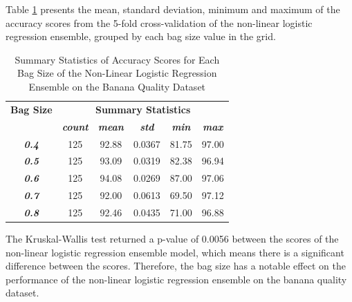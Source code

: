 \documentclass[10pt, conference]{IEEEtran}
\begin{document}
Table \ref{table: BQ_bagsize_nonlinear_performance_metrics} presents the mean, standard deviation, minimum and maximum of the
accuracy scores from the 5-fold cross-validation of the non-linear logistic regression ensemble, grouped by each bag size
value in the grid.
\begin{table}[H]
    \caption{Summary Statistics of Accuracy Scores for Each Bag Size of the Non-Linear Logistic Regression Ensemble on the Banana Quality Dataset}
    \begin{center}
        \begin{tabular}{|c||c|c|c|c|c|}
            \hline
            \textbf{Bag Size}&\multicolumn{5}{|c|}{\textbf{Summary Statistics}} \\
            \cline{2-6}
                                &\textbf{\textit{count}} & \textbf{\textit{mean}} & \textbf{\textit{std}} & \textbf{\textit{min}} & \textbf{\textit{max}}\\
            \hline
            \textbf{\textit{0.4}} & 125 & 92.88 & 0.0367 & 81.75 & 97.00 \\
            \textbf{\textit{0.5}} & 125 & 93.09 & 0.0319 & 82.38 & 96.94 \\
            \textbf{\textit{0.6}} & 125 & 94.08 & 0.0269 & 87.00 & 97.06 \\
            \textbf{\textit{0.7}} & 125 & 92.00 & 0.0613 & 69.50 & 97.12 \\
            \textbf{\textit{0.8}} & 125 & 92.46 & 0.0435 & 71.00 & 96.88 \\
            \hline
        \end{tabular}
    \end{center}
    \label{table: BQ_bagsize_nonlinear_performance_metrics}
\end{table}
The Kruskal-Wallis test returned a p-value of 0.0056 between the scores of the non-linear logistic regression ensemble model,
which means there is a significant difference between the scores. Therefore, the bag size has a notable effect on the
performance of the non-linear logistic regression ensemble on the banana quality dataset.
\end{document}
